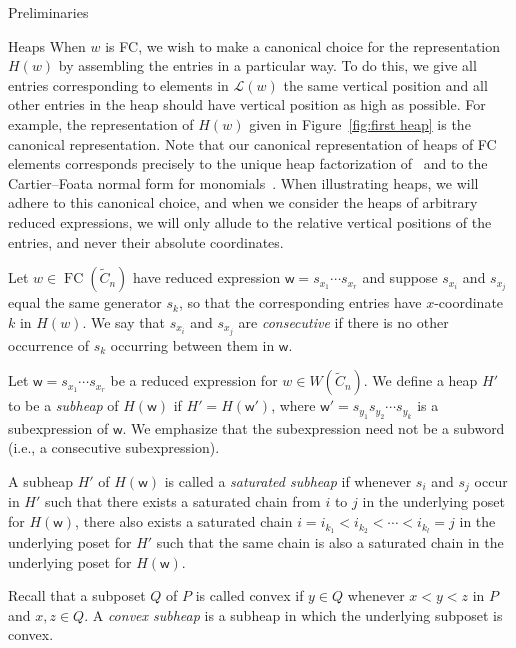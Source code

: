 \documentclass[11pt]{amsart}
\theoremstyle{definition}
\numberwithin{equation}{section}
\newcommand{\C}{\widetilde{C}}
\renewcommand{\L}{\mathcal{L}}
\renewcommand{\(}{\left(}
\renewcommand{\)}{\right)}
\newcommand{\w}{\mathsf{w}}
\DeclareMathOperator{\FC}{FC}
\begin{document}
\begin{section}{Preliminaries}
\begin{subsection}{Heaps}
When $w$ is FC, we wish to make a canonical choice for the representation $H(w)$ by assembling the entries in a particular way.  To do this, we give all entries corresponding to elements in $\L(w)$ the same vertical position and all other entries in the heap should have vertical position as high as possible.  For example, the representation of $H(w)$ given in Figure~\ref{fig:first heap} is the canonical representation.  Note that our canonical representation of heaps of FC elements corresponds precisely to the unique heap factorization of~\cite[Lemma 2.9]{Viennot1986} and to the Cartier--Foata normal form for monomials~\cite{Cartier1969,Green2006a}.  When illustrating heaps, we will adhere to this canonical choice, and when we consider the heaps of arbitrary reduced expressions, we will only allude to the relative vertical positions of the entries, and never their absolute coordinates.  

Let $w \in \FC(\C_n)$ have reduced expression $\w=s_{x_1}\cdots s_{x_r}$ and suppose $s_{x_i}$ and $s_{x_j}$ equal the same generator $s_k$, so that the corresponding entries have $x$-coordinate $k$ in $H(w)$.  We say that $s_{x_i}$ and $s_{x_j}$ are \emph{consecutive} if there is no other occurrence of $s_{k}$ occurring between them in $\w$.

Let $\w=s_{x_{1}} \cdots s_{x_{r}}$ be a reduced expression for $w \in W(\C_{n})$.  We define a heap $H'$ to be a \emph{subheap} of $H(\w)$ if $H'=H(\w')$, where $\w'=s_{y_1}s_{y_2} \cdots s_{y_k}$ is a subexpression of $\w$.  We emphasize that the subexpression need not be a subword (i.e., a consecutive subexpression).

A subheap $H'$ of $H(\w)$ is called a \emph{saturated subheap} if whenever $s_{i}$ and $s_{j}$ occur in $H'$ such that there exists a saturated chain from $i$ to $j$ in the underlying poset for $H(\w)$, there also exists a saturated chain $i=i_{k_{1}}<i_{k_{2}}< \cdots < i_{k_{l}}=j$ in the underlying poset for $H'$ such that the same chain is also a saturated chain in the underlying poset for $H(\w)$.

Recall that a subposet $Q$ of $P$ is called convex if $y \in Q$ whenever $x < y < z$ in $P$ and $x, z \in Q$.  A \emph{convex subheap} is a subheap in which the underlying subposet is convex.


\end{subsection}
\end{section}
\end{document}
